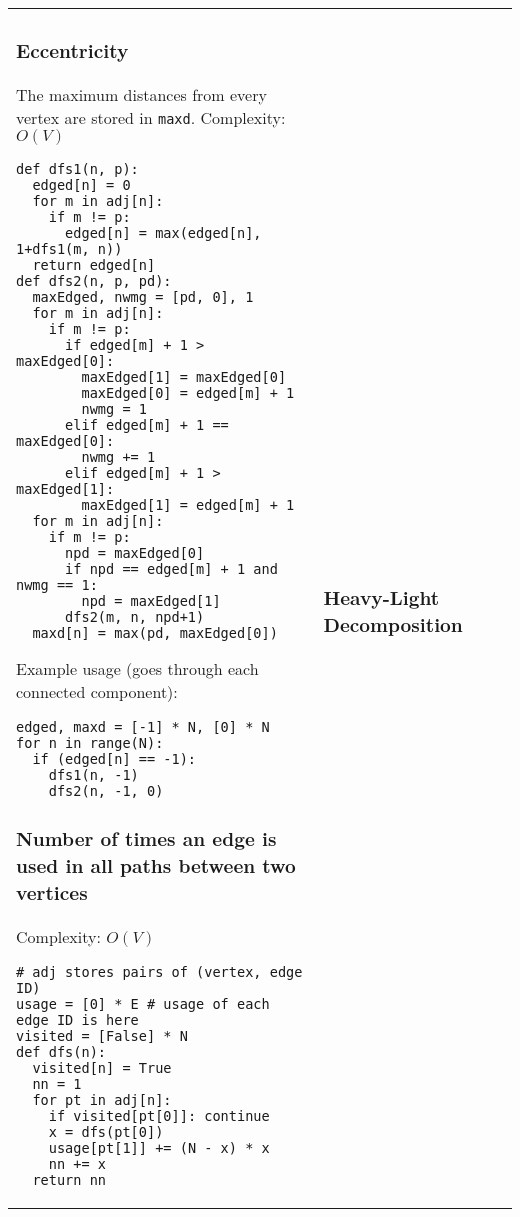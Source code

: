 \documentclass[letterpaper]{article}
\begin{document}
\clearpage
\begin{tabular}{@{}p{9cm}p{9cm}@{}}

    \subsubsection{Eccentricity}

    The maximum distances from every vertex are stored in \texttt{maxd}. Complexity: $O\left(V\right)$

    \begin{lstlisting}
def dfs1(n, p):
  edged[n] = 0
  for m in adj[n]:
    if m != p:
      edged[n] = max(edged[n], 1+dfs1(m, n))
  return edged[n]
def dfs2(n, p, pd):
  maxEdged, nwmg = [pd, 0], 1
  for m in adj[n]:
    if m != p:
      if edged[m] + 1 > maxEdged[0]:
        maxEdged[1] = maxEdged[0]
        maxEdged[0] = edged[m] + 1
        nwmg = 1
      elif edged[m] + 1 == maxEdged[0]:
        nwmg += 1
      elif edged[m] + 1 > maxEdged[1]:
        maxEdged[1] = edged[m] + 1
  for m in adj[n]:
    if m != p:
      npd = maxEdged[0]
      if npd == edged[m] + 1 and nwmg == 1:
        npd = maxEdged[1]
      dfs2(m, n, npd+1)
  maxd[n] = max(pd, maxEdged[0])
\end{lstlisting}

    Example usage (goes through each connected component):

    \begin{lstlisting}
edged, maxd = [-1] * N, [0] * N
for n in range(N):
  if (edged[n] == -1):
    dfs1(n, -1)
    dfs2(n, -1, 0)
\end{lstlisting}

    \subsubsection{Number of times an edge is used in all paths between two vertices}

    Complexity: $O\left(V\right)$

    \begin{lstlisting}
# adj stores pairs of (vertex, edge ID)
usage = [0] * E # usage of each edge ID is here
visited = [False] * N
def dfs(n): 
  visited[n] = True
  nn = 1
  for pt in adj[n]:
    if visited[pt[0]]: continue
    x = dfs(pt[0])
    usage[pt[1]] += (N - x) * x
    nn += x
  return nn
\end{lstlisting}
     &
    \subsubsection{Heavy-Light Decomposition}


\end{tabular}
\end{document}
